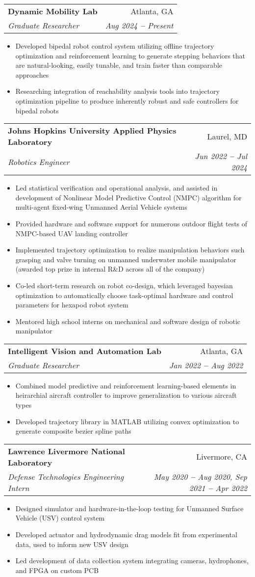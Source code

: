 \documentclass[letterpaper,11pt]{article}
\makeatletter
\newcommand{\resumeItem}[1]{
  \item\small{
    {#1 \vspace{-2pt}}
  }
}
\newcommand{\resumeSubheading}[4]{
  \vspace{-2pt}\item
    \begin{tabular*}{0.97\textwidth}[t]{l@{\extracolsep{\fill}}r}
      \textbf{#1} & #2 \\
      \textit{\small#3} & \textit{\small #4} \\
    \end{tabular*}\vspace{-7pt}
}
\newcommand{\resumeItemListStart}{\begin{itemize}}
\newcommand{\resumeItemListEnd}{\end{itemize}\vspace{-5pt}}
\makeatother
\begin{document}
    \resumeSubheading
      {Dynamic Mobility Lab}{Atlanta, GA}
      {Graduate Researcher}{Aug 2024 \textbf{--} Present}
      \resumeItemListStart
        \resumeItem{Developed bipedal robot control system utilizing offline trajectory optimization and reinforcement learning to generate stepping behaviors that are 
        natural-looking, easily tunable, and train faster than comparable approaches}
        \resumeItem{Researching integration of reachability analysis tools into trajectory optimization pipeline to produce inherently robust and safe controllers for bipedal robots}
      \resumeItemListEnd
    \resumeSubheading
      {Johns Hopkins University Applied Physics Laboratory}{Laurel, MD}
      {Robotics Engineer}{Jun 2022 \textbf{--} Jul 2024}
        \resumeItemListStart
      \resumeItem{Led statistical verification and operational analysis, and assisted in development of Nonlinear Model Predictive Control (NMPC) algorithm for
      multi-agent fixed-wing Unmanned Aerial Vehicle systems}
      \resumeItem{Provided hardware and software support for numerous outdoor flight tests of NMPC-based UAV landing controller}
      \resumeItem{Implemented trajectory optimization to realize manipulation behaviors such grasping and valve turning on
      unmanned underwater mobile manipulator (awarded top prize in internal R\&D across all of the company)}
      \resumeItem{Co-led short-term research on robot co-design, which leveraged bayesian optimization to automatically choose 
      task-optimal hardware and control parameters for hexapod robot system}
      \resumeItem{Mentored high school interns on mechanical and software design
      of robotic manipulator}
    \resumeItemListEnd
    
    \resumeSubheading
      {Intelligent Vision and Automation Lab}{Atlanta, GA}
      {Graduate Researcher}{Jan 2022 \textbf{--} Aug 2022}
        \resumeItemListStart
          \resumeItem{Combined model predictive and reinforcement learning-based elements in heirarchial aircraft controller to improve generalization to various aircraft types}
          \resumeItem{Developed trajectory library in MATLAB utilizing convex optimization to generate composite bezier spline paths}
    \resumeItemListEnd
    \resumeSubheading
      {Lawrence Livermore National Laboratory}{Livermore, CA}
      {Defense Technologies Engineering Intern}{May 2020 \textbf{--} Aug 2020,
      Sep 2021 \textbf{--} Apr 2022}
        \resumeItemListStart
      \resumeItem{Designed simulator and hardware-in-the-loop testing
      for Unmanned Surface Vehicle (USV) control system}
      \resumeItem{Developed actuator and hydrodynamic drag models fit from experimental
       data, used to inform new USV design}
      \resumeItem{Led development of data collection system integrating cameras,
      hydrophones, and FPGA on custom PCB}
        \resumeItemListEnd
    
\end{document}
